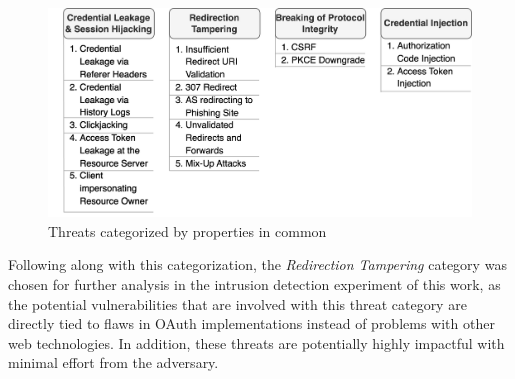 \begin{figure}[H]
	\sffamily\footnotesize
	\includegraphics[width=1\textwidth]{pic/threat_taxonomy.png}
	\unitlength=0.75mm
	\linethickness{0.4pt}
	\caption{Threats categorized by properties in common}
	\label{fig:threat_taxonomy}
\end{figure}

Following along with this categorization, the \emph{Redirection Tampering} category was chosen for further analysis in the intrusion detection experiment of this work, as the potential vulnerabilities that are involved with this threat category are directly tied to flaws in OAuth implementations instead of problems with other web technologies. In addition, these threats are potentially highly impactful with minimal effort from the adversary.